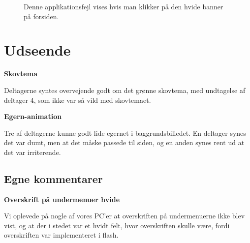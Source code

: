 \documentclass[10pt,a4paper]{article}      %
\newcommand\pic[1]{\texttt{[image: Pics/\#1]}}
\renewcommand\good{\pic{good}}
\renewcommand\smallproblem{\pic{smallproblem}}
\begin{document}
\begin{figure}[htbp]
    \centering
    \caption{Denne applikationsfejl vises hvis man klikker på den hvide banner på forsiden.}
    \label{fig:fejlmeddelelse}
\end{figure}

\section{Udseende}
\begin{kommentarer}
  \item[\good]{\textbf{Skovtema}}
  
  Deltagerne syntes overvejende godt om det grønne skovtema, med
  undtagelse af deltager 4, som ikke var så vild med skovtemaet.

  \item[\smallproblem]{\textbf{Egern-animation}} 
  
  Tre af deltagerne kunne godt lide egernet i baggrundsbilledet. En deltager
  synes det var dumt, men at det måske passede til siden, og en anden synes rent
  ud at det var irriterende.
\end{kommentarer}

\subsection{Egne kommentarer}

\begin{kommentarer}
  \item[\smallproblem]{\textbf{Overskrift på undermenuer hvide}}

  Vi oplevede på nogle af vores PC'er at overskriften på undermenuerne ikke blev
  vist, og at der i stedet var et hvidt felt, hvor overskriften skulle være,
  fordi overskriften var implementeret i flash.
\end{kommentarer}
\end{document}
